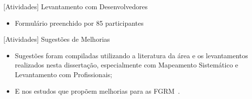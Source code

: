 \documentclass[t,14pt,mathserif]{beamer}
\begin{document}
\begin{frame}{[Atividades] Levantamento com Desenvolvedores}

    \begin{itemize}
        \item Formulário preenchido por 85 participantes
    \end{itemize}

    \begin{table}[htpb]
    \centering
    \caption{Função desempenhada pelos participantes}
\label{tab:grafico_melhorias_fgrm_funcao_particantes}
    \end{table}

\end{frame}

\begin{frame}{[Atividades] Sugestões de Melhorias}

    \begin{itemize}
        \item Sugestões foram compiladas utilizando a literatura da área e os
            levantamentos realizados nesta dissertação, especialmente com
            Mapeamento Sistemático e Levantamento com Profissionais;
        \item E nos estudos que propõem melhorias para as
            FGRM~\cite{zimmermann2009improving, bettenburg2008makes,
                singh2011bug}.
    \end{itemize}

\end{frame}
\end{document}
